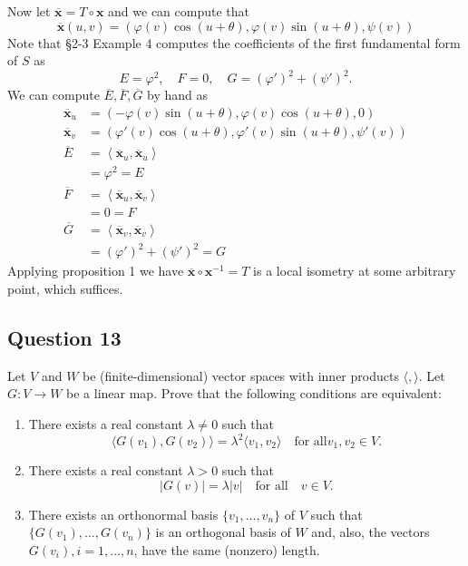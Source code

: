 \documentclass[12pt]{article}
\begin{document}
Now let \(\overline{\mathbf{x}} = T\circ\mathbf{x}\) and we can compute that
\[ \overline{\mathbf{x}}(u,v) = (\varphi(v)\cos(u+\theta), \varphi(v)\sin(u+\theta), \psi(v)) \]
Note that §2-3 Example 4 computes the coefficients of the first fundamental form of \(S\) as
\[ E = \varphi^2,\quad F = 0,\quad G = (\varphi')^2 + (\psi')^2. \]
We can compute \(\overline{E},\overline{F},\overline{G}\) by hand as
\begin{align*}
    \overline{\mathbf{x}}_u &= (-\varphi(v)\sin(u+\theta),\varphi(v)\cos(u+\theta), 0) \\
    \overline{\mathbf{x}}_v &= (\varphi'(v)\cos(u+\theta),\varphi'(v)\sin(u+\theta), \psi'(v)) \\
    \overline{E} &= \left\langle \overline{\mathbf{x}}_u, \overline{\mathbf{x}}_u \right\rangle \\
                 &= \varphi^2 = E\\
    \overline{F} &= \left\langle \overline{\mathbf{x}}_u, \overline{\mathbf{x}}_v \right\rangle \\
                 &= 0 = F \\
    \overline{G} &= \left\langle \overline{\mathbf{x}}_v, \overline{\mathbf{x}}_v \right\rangle \\
                 &= (\varphi')^2 + (\psi')^2 = G
\end{align*}
Applying proposition 1 we have \(\overline{\mathbf{x}}\circ\mathbf{x}^{-1} = T\) is a local isometry at some arbitrary point, which suffices.

\subsection*{Question 13}
Let $V$ and $W$ be (finite-dimensional) vector spaces with inner products $\langle ,\rangle$. Let $G: V \to W$ be a linear map. Prove that the following conditions are equivalent:
\begin{enumerate}
    \item There exists a real constant $\lambda \neq 0$ such that \begin{equation*}
        \langle G(v_1), G(v_2)\rangle = \lambda^2\langle v_1, v_2\rangle \quad \text{for all} v_1,v_2 \in V.
    \end{equation*}
    \item There exists a real constant $\lambda>0$ such that \begin{equation*}
        |G(v)| = \lambda |v|\quad \text{for all}\quad v \in V.
    \end{equation*}
    \item There exists an orthonormal basis $\{v_1,\dots,v_n\}$ of $V$ such that $\{G(v_1),...,G(v_n)\}$ is an orthogonal basis of $W$ and, also, the vectors $G(v_i), i = 1, ...,n$, have the same (nonzero) length.
\end{enumerate}
\end{document}
